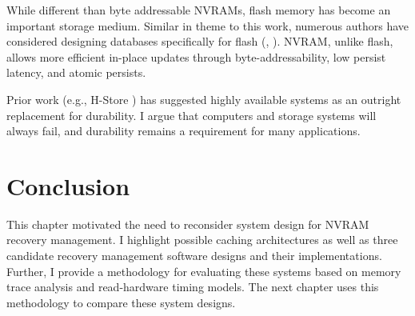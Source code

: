 While different than byte addressable NVRAMs, flash memory has become an important storage medium.
Similar in theme to this work, numerous authors have considered designing databases specifically for flash (\cite{BernsteinReid11}, \cite{SarwatMokbel11}).
NVRAM, unlike flash, allows more efficient in-place updates through byte-addressability, low persist latency, and atomic persists.

Prior work (e.g., H-Store \cite{StonebrakerMadden07}) has suggested highly available systems as an outright replacement for durability.
I argue that computers and storage systems will always fail, and durability remains a requirement for many applications.

\section{Conclusion}
\label{sec:OLTP_design:Conclusion}
This chapter motivated the need to reconsider system design for NVRAM recovery management.
I highlight possible caching architectures as well as three candidate recovery management software designs and their implementations.
Further, I provide a methodology for evaluating these systems based on memory trace analysis and read-hardware timing models.
The next chapter uses this methodology to compare these system designs.
